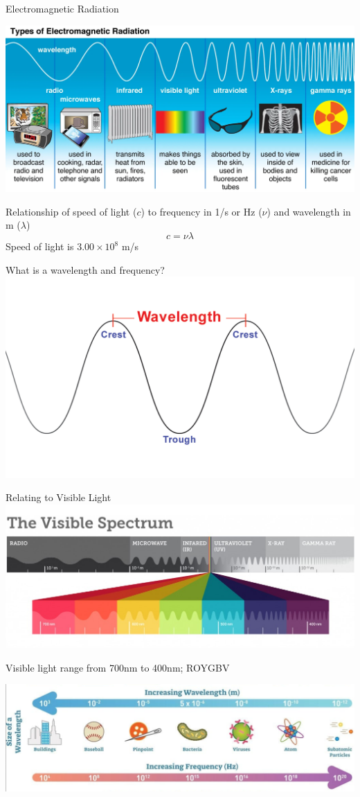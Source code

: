 \documentclass[11pt]{beamer}
\begin{document}
\begin{frame}{Electromagnetic Radiation}
  \begin{center}
  \includegraphics[width=0.8\linewidth]{electromag_types}
  \end{center}
  Relationship of speed of light ($c$) to frequency in 1/s or Hz ($\nu$) and
  wavelength in m ($\lambda$)
  \begin{equation}
    c = \nu\lambda
  \end{equation}
  Speed of light is $3.00\times 10^8$ m/s
\end{frame}

\begin{frame}{What is a wavelength and frequency?}
  \centering
  \includegraphics[width=0.8\linewidth]{wavelength}
\end{frame}

\begin{frame}{Relating to Visible Light}
  \centering
  \includegraphics[width=0.85\linewidth]{visible_light}
  
  Visible light range from 700nm to 400nm;
  ROYGBV
  
  \includegraphics[width=0.85\linewidth]{wave_freq_size}
\end{frame}
\end{document}
